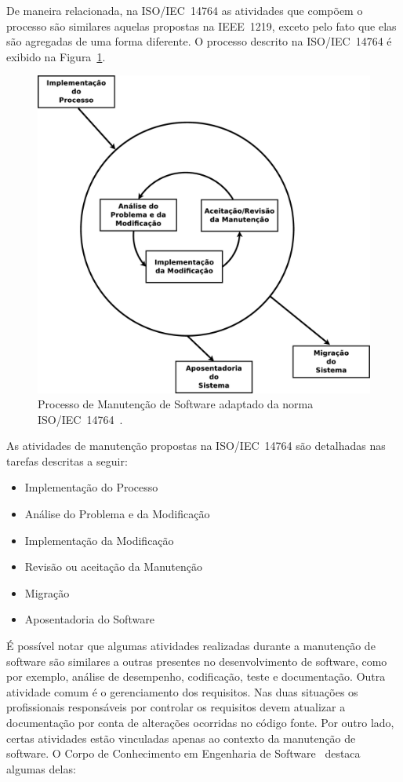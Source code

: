 De maneira relacionada, na ISO/IEC~14764 as atividades que compõem o processo
são similares aquelas propostas na IEEE~1219, exceto pelo fato que elas são
agregadas de uma forma diferente. O processo descrito na ISO/IEC~14764 é exibido
na Figura~\ref{fig:ieee-14764-processo-manutencao}.

\begin{figure}[htpb]
    \centering
    \includegraphics[width=0.9\linewidth]
    {chapter-manutencao-software-visao-geral/img/ieee-14764-processo-manutencao.eps}
    \caption{Processo de Manutenção de Software adaptado da norma
        ISO/IEC~14764~\cite{institute2006norma}.}\label{fig:ieee-14764-processo-manutencao}
\end{figure}

As atividades de manutenção propostas na ISO/IEC~14764 são detalhadas nas
tarefas descritas a seguir:

\begin{itemize}
   	\item Implementação do Processo
   	\item Análise do Problema e da Modificação
    \item Implementação da Modificação
	\item Revisão ou aceitação da Manutenção
   	\item Migração
   	\item Aposentadoria do Software
\end{itemize}

É possível notar que algumas atividades realizadas durante a manutenção de
software são similares a outras presentes no desenvolvimento de software, como
por exemplo, análise de desempenho, codificação, teste e documentação. Outra
atividade comum é o gerenciamento dos requisitos. Nas duas situações os
profissionais responsáveis por controlar os requisitos devem atualizar a
do\-cu\-men\-ta\-ção  por conta de alterações ocorridas no código fonte. Por
outro lado, certas atividades estão vinculadas apenas ao contexto da manutenção
de software. O Corpo de Conhecimento em Engenharia de Software~\cite{4425813}
destaca algumas delas:

